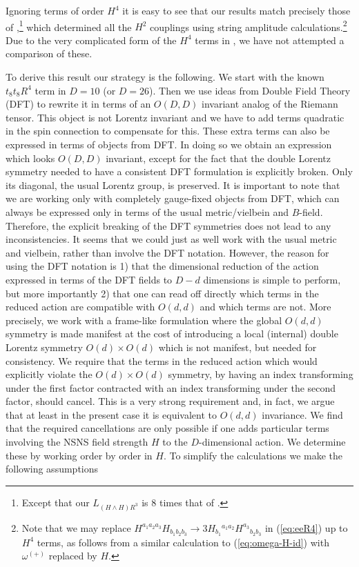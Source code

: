 \documentclass[a4paper,11pt]{article}
\begin{document}
Ignoring terms of order $H^4$ it is easy to see that our results match precisely those of \cite{Liu:2019ses},\footnote{Except that our $L_{(H\wedge H)R^3}$ is 8 times that of \cite{Liu:2019ses}.} which determined all the $H^2$ couplings using string amplitude calculations.\footnote{Note that we may replace $H^{a_1a_2a_3}H_{b_1b_2b_3}\rightarrow 3H_{b_1}{}^{a_1a_2}H^{a_3}{}_{b_2b_3}$ in (\ref{eq:eeR4}) up to $H^4$ terms, as follows from a similar calculation to (\ref{eq:omega-H-id}) with $\omega^{(+)}$ replaced by $H$.} Due to the very complicated form of the $H^4$ terms in \cite{Garousi:2020gio}, we have not attempted a comparison of these.


To derive this result our strategy is the following. We start with the known $t_8t_8R^4$ term in $D=10$ (or $D=26$). Then we use ideas from Double Field Theory (DFT) \cite{Siegel:1993th,Hull:2009mi,Hohm:2010pp} to rewrite it in terms of an $O(D,D)$ invariant analog of the Riemann tensor. This object is not Lorentz invariant and we have to add terms quadratic in the spin connection to compensate for this. These extra terms can also be expressed in terms of objects from DFT. In doing so we obtain an expression which looks $O(D,D)$ invariant, except for the fact that the double Lorentz symmetry needed to have a consistent DFT formulation is explicitly broken. Only its diagonal, the usual Lorentz group, is preserved. It is important to note that we are working only with completely gauge-fixed objects from DFT, which can always be expressed only in terms of the usual metric/vielbein and $B$-field. Therefore, the explicit breaking of the DFT symmetries does not lead to any inconsistencies. It seems that we could just as well work with the usual metric and vielbein, rather than involve the DFT notation. However, the reason for using the DFT notation is 1) that the dimensional reduction of the action expressed in terms of the DFT fields to $D-d$ dimensions is simple to perform, but more importantly 2) that one can read off directly which terms in the reduced action are compatible with $O(d,d)$ and which terms are not. More precisely, we work with a frame-like formulation where the global $O(d,d)$ symmetry is made manifest at the cost of introducing a local (internal) double Lorentz symmetry $O(d)\times O(d)$ which is not manifest, but needed for consistency. We require that the terms in the reduced action which would explicitly violate the $O(d)\times O(d)$ symmetry, by having an index transforming under the first factor contracted with an index transforming under the second factor, should cancel. {This is a very strong requirement and, in fact, we argue that at least in the present case it is equivalent to $O(d,d)$ invariance. We find} that the required cancellations are only possible if one adds particular terms involving the NSNS field strength $H$ to the $D$-dimensional action. We determine these by working order by order in $H$. To simplify the calculations we make the following assumptions
\end{document}
